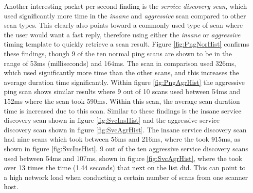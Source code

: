 Another interesting packet per second finding is the \textit{service discovery scan}, which used significantly more time in the \textit{insane} and \textit{aggressive} scan compared to other scan types.
This clearly also points toward a commonly used type of scan where the user would want a fast reply, therefore using either the \textit{insane} or \textit{aggressive} timing template to quickly retrieve a scan result.
Figure \ref{fig:PngNorHist} confirms these findings, though 9 of the ten normal ping scans are shown to be in the range of 53ms (milliseconds) and 164ms. The  scan in comparison used 326ms, which used significantly more time than the other scans, and this increases the average duration time significantly.
Within figure \ref{fig:PngAgrHist} the aggressive ping scan shows similar results where 9 out of 10 scans used between 54ms and 152ms where the  scan took 590ms. Within this scan, the average scan duration time is increased due to this  scan.
Similar to these findings is the insane service discovery scan shown in figure \ref{fig:SvcInsHist} and the aggressive service discovery scan shown in figure \ref{fig:SvcAgrHist}.
The insane service discovery scan had nine scans which took between 56ms and 216ms, where the  took 915ms, as shown in figure \ref{fig:SvcInsHist}.
9 out of the ten aggressive service discovery scans used between 54ms and 107ms, shown in figure \ref{fig:SvcAgrHist}, where the  took over 13 times the time (1.44 seconds) that next on the list did. This can point to a high network load when conducting a certain number of scans from one scanner host.

\vfill
\clearpage

